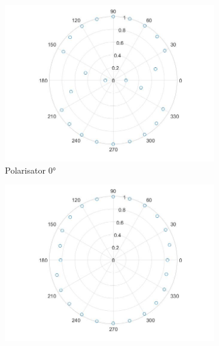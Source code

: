 \documentclass[a4paper, 12pt,]{scrartcl}
\begin{document}


\begin{figure}[H]\centering
\begin{adjustwidth}{-1em}{7em}
  \begin{subfigure}[b]{0.5\textwidth}
    \includegraphics[width=\textwidth]{M1}
    \caption{Polarisator 0°}
    \label{fig:}
  \end{subfigure}
  \begin{subfigure}[b]{0.5\textwidth}
    \includegraphics[width=\textwidth]{M2}

\end{subfigure}
\end{adjustwidth}
\end{figure}
\end{document}
